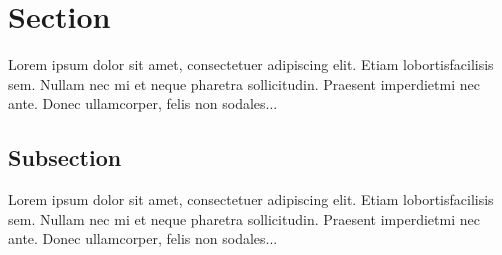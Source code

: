 \documentclass{article}
\begin{document}
\tableofcontents
\section{Section}
Lorem ipsum dolor sit amet, consectetuer adipiscing elit. Etiam lobortisfacilisis sem. Nullam nec mi et neque pharetra sollicitudin. Praesent imperdietmi nec ante. Donec ullamcorper, felis non sodales... 
\subsection{Subsection} 
Lorem ipsum dolor sit amet, consectetuer adipiscing elit. Etiam lobortisfacilisis sem. Nullam nec mi et neque pharetra sollicitudin. Praesent imperdietmi nec ante. Donec ullamcorper, felis non sodales... 
\end{document}
